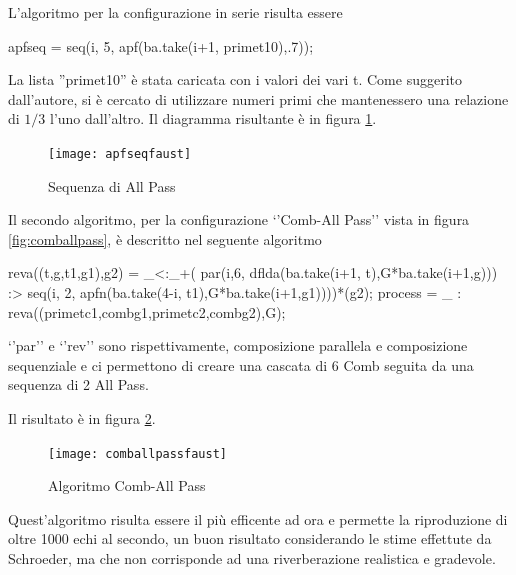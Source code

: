 L'algoritmo per la configurazione in serie risulta essere

\begin{code}
apfseq =  seq(i, 5, apf(ba.take(i+1, primet10),.7));
\end{code}

La lista ''primet10'' è stata caricata con i valori dei vari t. Come suggerito dall'autore, si è cercato di utilizzare numeri primi che mantenessero una relazione di $1/3$ l'uno dall'altro.
Il diagramma risultante è in figura \ref{fig:apfseqfaust}.

\begin{figure}[htp]
\centering
\texttt{[image: apfseqfaust]}
\caption{Sequenza di All Pass}
\label{fig:apfseqfaust}
\end{figure}

Il secondo algoritmo, per la configurazione `'Comb-All Pass'' vista in figura \ref{fig:comballpass}, è descritto nel seguente algoritmo

\begin{code}
reva((t,g,t1,g1),g2) = _<:_+(
    par(i,6, dflda(ba.take(i+1, t),G*ba.take(i+1,g))) :>
    seq(i, 2, apfn(ba.take(4-i, t1),G*ba.take(i+1,g1))))*(g2);
process = _ : reva((primetc1,combg1,primetc2,combg2),G);
\end{code}

`'par'' e `'rev'' sono rispettivamente, composizione parallela e composizione sequenziale e ci permettono di creare una cascata di 6 Comb seguita da una sequenza di 2 All Pass.

Il risultato è in figura \ref{fig:comballpassfaust}.

\begin{figure}[htp]
\centering
\texttt{[image: comballpassfaust]}
\caption{Algoritmo Comb-All Pass}
\label{fig:comballpassfaust}
\end{figure}

Quest'algoritmo risulta essere il più efficente ad ora e permette la riproduzione di oltre 1000 echi al secondo, un buon risultato considerando le stime effettute da Schroeder, ma che non corrisponde ad una riverberazione realistica e gradevole.

